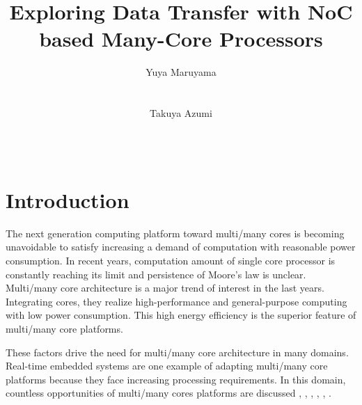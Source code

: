 \documentclass{sig-alternate-05-2015}
\author{
\alignauthor Yuya Maruyama\\
\affaddr{Graduate School of Engineering Science}\\
\affaddr{Osaka University}\\
\alignauthor Takuya Azumi\\
\affaddr{Graduate School of Engineering Science}\\
\affaddr{Osaka University}\\
}
\title{Exploring Data Transfer with NoC based Many-Core Processors}
\begin{document}

\maketitle

\setcounter{topnumber}{5}%
\def\topfraction{1.00}%
\setcounter{bottomnumber}{5}%
\def\bottomfraction{1.00}%
\setcounter{totalnumber}{10}%
\def\textfraction{0.00}%


\begin{abstract}
\end{abstract}



\section{Introduction}
The next generation computing platform toward multi/many cores is becoming unavoidable to satisfy increasing a demand of computation with reasonable power consumption.
In recent years, computation amount of single core processor is constantly reaching its limit and persistence of Moore's law \cite{moore2006cramming} is unclear.
Multi/many core architecture is a major trend of interest in the last years.
Integrating cores, they realize high-performance and general-purpose computing with low power consumption.
This high energy efficiency is the superior feature of multi/many core platforms.

These factors drive the need for multi/many core architecture in many domains.
Real-time embedded systems are one example of adapting multi/many core platforms because they face increasing processing requirements.
In this domain, countless opportunities of multi/many cores platforms are discussed \cite{becker2016contention}, \cite{saidi2015shift}, , \cite{perret2016temporal}, \cite{perret2016mapping}, \cite{becker2014mapping}.
\end{document}
